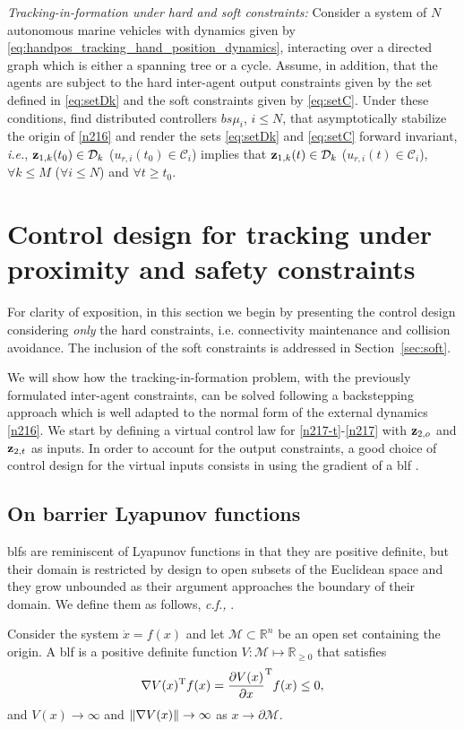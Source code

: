 {\it Tracking-in-formation under hard and soft constraints:} Consider a system of $N$ autonomous marine vehicles with dynamics given by \eqref{eq:handpos_tracking_hand_position_dynamics}, interacting over a directed graph which is either a spanning tree or a cycle.
Assume, in addition, that the agents are subject to the hard inter-agent output constraints given by the set defined in \eqref{eq:setDk} and the soft constraints given by \eqref{eq:setC}.
Under these conditions, find distributed controllers $bs{\mu}_i$, $i\leq N$, that asymptotically stabilize the origin of \eqref{n216} and render the sets \eqref{eq:setDk} and \eqref{eq:setC} forward invariant, \emph{i.e.}, $\mathbf{z}_{1, k}(t_0)\in\mathcal{D}_k$ ($u_{r, i}(t_0)\in\mathcal{C}_i$) implies that $\mathbf{z}_{1, k}(t)\in \mathcal{D}_k$ ($u_{r, i}(t)\in\mathcal{C}_i$), $\forall k\leq M$ ($\forall i\leq N$) and $\forall t\geq t_0$.

\section{Control design for tracking under proximity and safety constraints}
\label{sec:ctrl}

For clarity of exposition, in this section we begin by presenting the control design considering \emph{only} the hard constraints, i.e. connectivity maintenance and collision avoidance. The inclusion of the soft constraints is addressed in Section~\ref{sec:soft}.

We will show how the tracking-in-formation problem, with the previously formulated inter-agent constraints, can be solved following a backstepping approach which is well adapted to the normal form of the external dynamics \eqref{n216}. We start by defining a virtual control law for \eqref{n217-t}-\eqref{n217} with $\mathbf{z}_{2, o}$ and $\mathbf{z}_{2, t}$ as inputs. 
In order to account for the output constraints, a good choice of control design for the virtual inputs consists in using the gradient of a \acrfull{blf} \cite{tee_barrier_2009}.

\subsection{On barrier Lyapunov functions}

\Glspl{blf} are reminiscent of Lyapunov functions in that they are positive definite, but their domain is restricted by design to open subsets of the Euclidean space and they grow unbounded as their argument approaches the boundary of their domain.
We define them as follows, \emph{c.f.,} \cite{tee_barrier_2009}.
\begin{dfn}[BLF]\label{def:TAC-barrier-function}
	Consider the system $\dot{x} = f(x)$ and let $\mathcal M \subset \mathbb{R}^n$ be an open set containing the origin.
	A \gls{blf} is a positive definite function $V : \mathcal M \mapsto \mathbb{R}_{\geq 0}$ that satisfies
	\[%
	\nabla V(x)\T f(x) = \frac{\partial V(x)}{\partial x}\T f(x)\leq 0,\]	
	and $V(x) \rightarrow \infty$ and $\left\|\nabla V(x)\right\| \rightarrow \infty$ as $x \rightarrow \partial \mathcal M$. 
\end{dfn}

